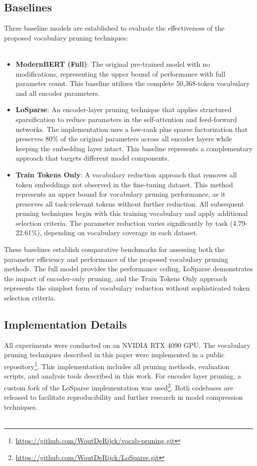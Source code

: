 \documentclass[twocolumn]{article}
\begin{document}
\subsection{Baselines}
Three baseline models are established to evaluate the effectiveness of the proposed vocabulary pruning techniques:
\\ \\
\begin{itemize}
    \item \textbf{ModernBERT (Full)}: The original pre-trained model with no modifications, representing the upper bound of performance with full parameter count. This baseline utilizes the complete 50,368-token vocabulary and all encoder parameters.
    \item \textbf{LoSparse}: An encoder-layer pruning technique that applies structured sparsification to reduce parameters in the self-attention and feed-forward networks. The implementation uses a low-rank plus sparse factorization that preserves 80\% of the original parameters across all encoder layers while keeping the embedding layer intact. This baseline represents a complementary approach that targets different model components.
    \item \textbf{Train Tokens Only}: A vocabulary reduction approach that removes all token embeddings not observed in the fine-tuning dataset. This method represents an upper bound for vocabulary pruning performance, as it preserves all task-relevant tokens without further reduction. All subsequent pruning techniques begin with this training vocabulary and apply additional selection criteria. The parameter reduction varies significantly by task (4.79-22.61\%), depending on vocabulary coverage in each dataset.
\end{itemize}
These baselines establish comparative benchmarks for assessing both the parameter efficiency and performance of the proposed vocabulary pruning methods. The full model provides the performance ceiling, LoSparse demonstrates the impact of encoder-only pruning, and the Train Tokens Only approach represents the simplest form of vocabulary reduction without sophisticated token selection criteria.

\subsection{Implementation Details}
All experiments were conducted on an NVIDIA RTX 4090 GPU. The vocabulary pruning techniques described in this paper were implemented in a public repository\footnote{\url{https://github.com/WoutDeRijck/vocab-pruning.git}}. This implementation includes all pruning methods, evaluation scripts, and analysis tools described in this work. For encoder layer pruning, a custom fork of the LoSparse implementation was used\footnote{\url{https://github.com/WoutDeRijck/LoSparse.git}}. Both codebases are released to facilitate reproducibility and further research in model compression techniques.
\\ \\
\end{document}
